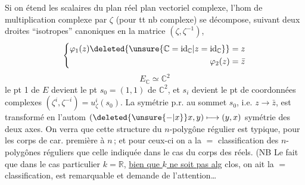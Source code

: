 Si on étend les scalaires du plan  réel
 plan vectoriel complexe, l'hom  de
multiplication complexe par $\zeta$ (pour tt nb
complexe) se décompose, suivant deux
droites ``isotropes'' canoniques en
la matrice  $(\zeta,\zeta^{-1})$,
\[
\left\{\begin{aligned}
\varphi_1(z)\deleted{\unsure{\mathbb C=\mathrm{id}_{\mathbb C}|z=\mathrm{id}_{\mathbb C}}}&=z\\
\varphi_2(z)&=\bar z
\end{aligned}\right.
\]
\[
E_{\mathbb C}\simeq\mathbb C^2
\]
le pt 1 de $E$ devient
le pt $s_0=(1,1)$ de $\mathbb C^2$,
et $s_i$ devient le pt de coordonnées
complexes $(\zeta^i,\zeta^{-i})=u_\zeta^i(s_0)$. La symétrie
p.r. au sommet $s_0$, i.e. $z\longrightarrow\bar z$, est
transformé en l'autom $(\deleted{\unsure{-|x}}x,y)\longmapsto(y,x)$
symétrie des deux axes. On verra que
cette structure du $n$-polygône régulier
est typique, pour les corps  de car.
première à $n$\,; et pour ceux-ci on a la $=$
classification des $n$-polygônes réguliers  que
celle indiquée dans le cas du corps des
réels. (NB Le fait que dans le cas
particulier $k=\mathbb R$, \uline{bien que $k$ ne soit pas
alg} clos, on ait la $=$ classification, est
remarquable et demande de l'attention\ldots

